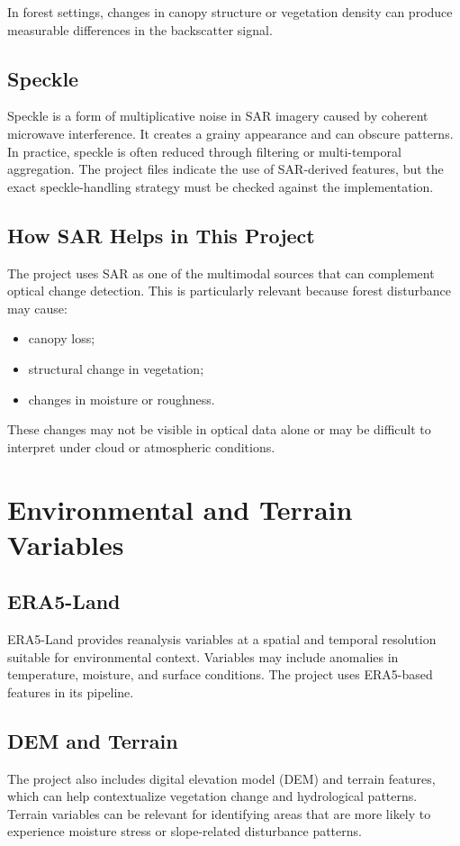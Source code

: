 \documentclass[11pt]{article}
\begin{document}
In forest settings, changes in canopy structure or vegetation density can produce measurable differences in the backscatter signal.

\subsection{Speckle}
Speckle is a form of multiplicative noise in SAR imagery caused by coherent microwave interference. It creates a grainy appearance and can obscure patterns. In practice, speckle is often reduced through filtering or multi-temporal aggregation. The project files indicate the use of SAR-derived features, but the exact speckle-handling strategy must be checked against the implementation.

\subsection{How SAR Helps in This Project}
The project uses SAR as one of the multimodal sources that can complement optical change detection. This is particularly relevant because forest disturbance may cause:
\begin{itemize}
    \item canopy loss;
    \item structural change in vegetation;
    \item changes in moisture or roughness.
\end{itemize}
These changes may not be visible in optical data alone or may be difficult to interpret under cloud or atmospheric conditions.

\section{Environmental and Terrain Variables}

\subsection{ERA5-Land}
ERA5-Land provides reanalysis variables at a spatial and temporal resolution suitable for environmental context. Variables may include anomalies in temperature, moisture, and surface conditions. The project uses ERA5-based features in its pipeline.

\subsection{DEM and Terrain}
The project also includes digital elevation model (DEM) and terrain features, which can help contextualize vegetation change and hydrological patterns. Terrain variables can be relevant for identifying areas that are more likely to experience moisture stress or slope-related disturbance patterns.
\end{document}
